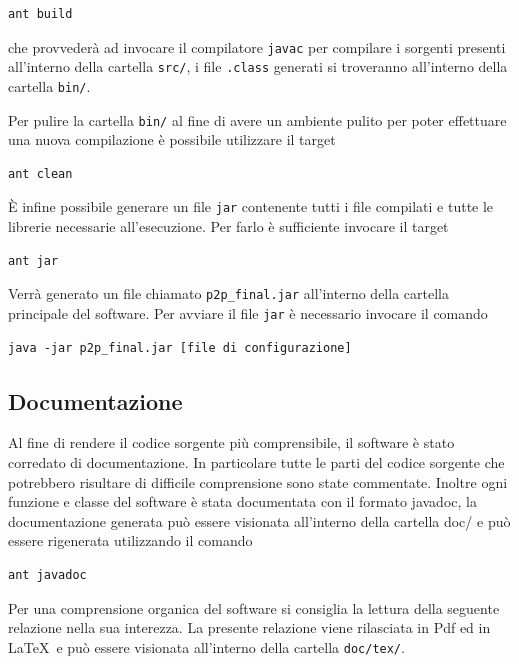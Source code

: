\documentclass[a4paper,12pt]{article}
\begin{document}
\begin{lstlisting}[basicstyle=\ttfamily]
ant build
\end{lstlisting}

che provveder\`a ad invocare il compilatore \texttt{javac} per compilare i sorgenti presenti all'interno della cartella \texttt{src/}, i file \texttt{.class} generati si troveranno all'interno della cartella \texttt{bin/}. 

Per pulire la cartella \texttt{bin/} al fine di avere un ambiente pulito per poter effettuare una nuova compilazione \`e possibile utilizzare il target
\begin{lstlisting}[basicstyle=\ttfamily]
ant clean
\end{lstlisting}

\`E infine possibile generare un file \texttt{jar} contenente tutti i file compilati e tutte le librerie necessarie all'esecuzione. Per farlo \`e sufficiente invocare il target
\begin{lstlisting}[basicstyle=\ttfamily]
ant jar
\end{lstlisting}
Verr\`a generato un file chiamato \texttt{p2p\_final.jar} all'interno della cartella principale del software.
Per avviare il file \texttt{jar} \`e necessario invocare il comando
\begin{lstlisting}[basicstyle=\ttfamily]
java -jar p2p_final.jar [file di configurazione]
\end{lstlisting}

\subsection{Documentazione}

Al fine di rendere il codice sorgente pi\`u comprensibile, il software \`e stato corredato di documentazione. In particolare tutte le parti del codice sorgente che potrebbero risultare di difficile comprensione sono state commentate. Inoltre ogni funzione e classe del software \`e stata documentata con il formato \textsf {javadoc}, la documentazione generata pu\`o essere visionata all'interno della cartella \textsf{doc/} e pu\`o essere rigenerata utilizzando il comando
\begin{lstlisting}[basicstyle=\ttfamily]
ant javadoc
\end{lstlisting}

Per una comprensione organica del software si consiglia la lettura della seguente relazione nella sua interezza. La presente relazione viene rilasciata in Pdf ed in \LaTeX\ e pu\`o essere visionata all'interno della cartella \texttt{doc/tex/}.
\end{document}
